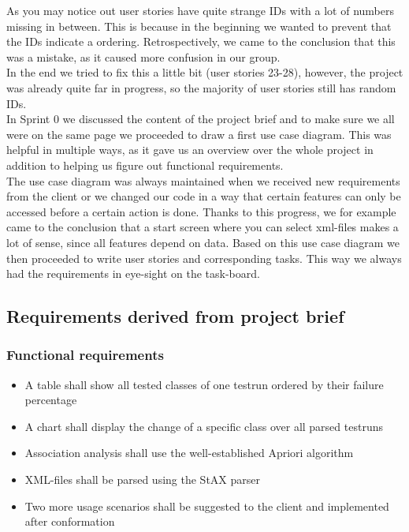 As you may notice out user stories have quite strange IDs with a lot of numbers missing in between. This is because in the beginning we wanted to prevent that the IDs indicate a ordering. Retrospectively, we came to the conclusion that this was a mistake, as it caused more confusion in our group.\\
In the end we tried to fix this a little bit (user stories 23-28), however, the project was already quite far in progress, so the majority of user stories still has random IDs.  \\
\newline
In Sprint 0 we discussed the content of the project brief and to make sure we all were on the same page we proceeded to draw a first use case diagram. This was helpful in multiple ways, as it gave us an overview over the whole project in addition to helping us figure out functional requirements.\\
The use case diagram was always maintained when we received new requirements from the client or we changed our code in a way that certain features can only be accessed before a certain action is done. Thanks to this progress, we for example came to the conclusion that a start screen where you can select xml-files makes a lot of sense, since all features depend on data.
Based on this use case diagram we then proceeded to write user stories and corresponding tasks. This way we always had the requirements in eye-sight on the task-board.

\subsection{Requirements derived from project brief}
\subsubsection{Functional requirements}
\begin{itemize}	
	\item A table shall show all tested classes of one testrun ordered by their failure percentage
	\item A chart shall display the change of a specific class over all parsed testruns
	\item Association analysis shall use the well-established Apriori algorithm
	\item XML-files shall be parsed using the StAX parser
	\item Two more usage scenarios shall be suggested to the client and implemented after conformation
\end{itemize}

